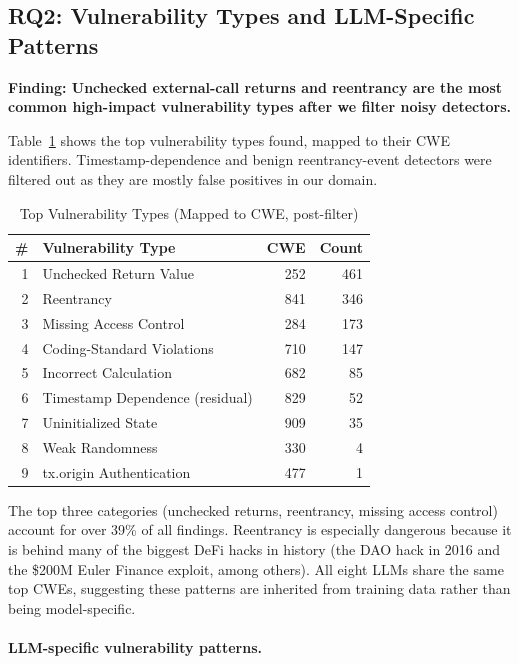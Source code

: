 \documentclass[11pt]{article}
\begin{document}
\subsection{RQ2: Vulnerability Types and LLM-Specific Patterns}

\textbf{Finding: Unchecked external-call returns and reentrancy are the most common high-impact vulnerability types after we filter noisy detectors.}

Table~\ref{tab:taxonomy} shows the top vulnerability types found, mapped to their CWE identifiers. Timestamp-dependence and benign reentrancy-event detectors were filtered out as they are mostly false positives in our domain.

\begin{table}[H]
\centering
\caption{Top Vulnerability Types (Mapped to CWE, post-filter)}
\label{tab:taxonomy}
\small
\begin{tabular}{@{}rlrr@{}}
\toprule
\textbf{\#} & \textbf{Vulnerability Type} & \textbf{CWE} & \textbf{Count} \\
\midrule
1 & Unchecked Return Value     & 252 & 461 \\
2 & Reentrancy                 & 841 & 346 \\
3 & Missing Access Control     & 284 & 173 \\
4 & Coding-Standard Violations & 710 & 147 \\
5 & Incorrect Calculation      & 682 &  85 \\
6 & Timestamp Dependence (residual) & 829 &  52 \\
7 & Uninitialized State        & 909 &  35 \\
8 & Weak Randomness            & 330 &   4 \\
9 & tx.origin Authentication   & 477 &   1 \\
\bottomrule
\end{tabular}
\end{table}

The top three categories (unchecked returns, reentrancy, missing access control) account for over 39\% of all findings. Reentrancy is especially dangerous because it is behind many of the biggest DeFi hacks in history (the DAO hack in 2016 and the \$200M Euler Finance exploit, among others). All eight LLMs share the same top CWEs, suggesting these patterns are inherited from training data rather than being model-specific.

\paragraph{LLM-specific vulnerability patterns.}
\end{document}
